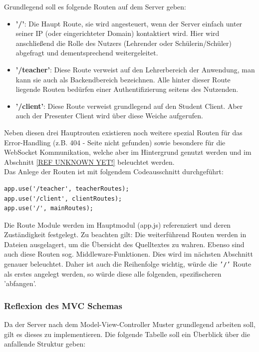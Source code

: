 Grundlegend soll es folgende Routen auf dem Server geben:
\begin{itemize}
	\item \textbf{'/'}: Die Haupt Route, sie wird angesteuert, wenn der Server einfach unter seiner IP (oder eingerichteter Domain) kontaktiert wird. Hier wird anschließend die Rolle des Nutzers (Lehrender oder Schülerin/Schüler) abgefragt  und dementsprechend weitergeleitet.
	\item \textbf{'/teacher'}: Diese Route verweist auf den Lehrerbereich der Anwendung, man kann sie auch als Backendbereich bezeichnen. Alle hinter dieser Route liegende Routen bedürfen einer Authentifizierung seitens des Nutzenden.
	\item \textbf{'/client'}: Diese Route verweist grundlegend auf den Student Client. Aber auch der Presenter Client wird über diese Weiche aufgerufen. 
\end{itemize}
Neben diesen drei Hauptrouten existieren noch weitere spezial Routen für das Error-Handling (z.B. 404 - Seite nicht gefunden) sowie besondere für die WebSocket Kommunikation, welche aber im Hintergrund genutzt werden und im Abschnitt \ref{REF UNKNOWN YET!} beleuchtet werden.\\ 
Das Anlege der Routen ist mit folgendem Codeausschnitt durchgeführt:
\begin{lstlisting}[caption=Anlegen der Routen]
app.use('/teacher', teacherRoutes);
app.use('/client', clientRoutes);
app.use('/', mainRoutes);
\end{lstlisting}
\footnotesize{Die Route Module werden im Hauptmodul (app.js) referenziert und deren Zuständigkeit festgelegt.}
\normalsize
Zu beachten gilt: Die weiterführend Routen werden in Dateien ausgelagert, um die Übersicht des Quelltextes zu wahren. Ebenso sind auch diese Routen sog. Middleware-Funktionen. Dies wird im nächsten Abschnitt genauer beleuchtet. Daher ist auch die Reihenfolge wichtig, würde die \texttt{'/'} Route als erstes angelegt werden, so würde diese alle folgenden, spezifischeren 'abfangen'.  


\subsubsection{Reflexion des MVC Schemas}\label{sec:mvc}
Da der Server nach dem Model-View-Controller Muster grundlegend arbeiten soll, gilt es dieses zu implementieren. Die folgende Tabelle soll ein Überblick über die anfallende Struktur geben:

